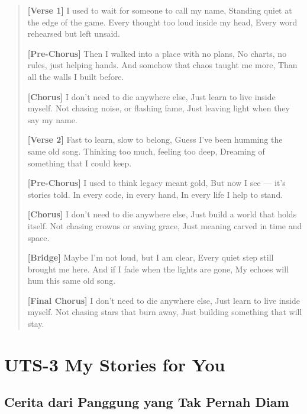 \documentclass[
  letterpaper,
  DIV=11,
  numbers=noendperiod]{scrreprt}
\begin{document}
\begin{quote}
\textbf{{[}Verse 1{]}} I used to wait for someone to call my name,
Standing quiet at the edge of the game. Every thought too loud inside my
head, Every word rehearsed but left unsaid.

\textbf{{[}Pre-Chorus{]}} Then I walked into a place with no plans, No
charts, no rules, just helping hands. And somehow that chaos taught me
more, Than all the walls I built before.

\textbf{{[}Chorus{]}} I don't need to die anywhere else, Just learn to
live inside myself. Not chasing noise, or flashing fame, Just leaving
light when they say my name.

\textbf{{[}Verse 2{]}} Fast to learn, slow to belong, Guess I've been
humming the same old song. Thinking too much, feeling too deep, Dreaming
of something that I could keep.

\textbf{{[}Pre-Chorus{]}} I used to think legacy meant gold, But now I
see --- it's stories told. In every code, in every hand, In every life I
help to stand.

\textbf{{[}Chorus{]}} I don't need to die anywhere else, Just build a
world that holds itself. Not chasing crowns or saving grace, Just
meaning carved in time and space.

\textbf{{[}Bridge{]}} Maybe I'm not loud, but I am clear, Every quiet
step still brought me here. And if I fade when the lights are gone, My
echoes will hum this same old song.

\textbf{{[}Final Chorus{]}} I don't need to die anywhere else, Just
learn to live inside myself. Not chasing stars that burn away, Just
building something that will stay.
\end{quote}


\chapter{UTS-3 My Stories for You}\label{uts-3-my-stories-for-you}

\section{Cerita dari Panggung yang Tak Pernah
Diam}\label{cerita-dari-panggung-yang-tak-pernah-diam}
\end{document}
